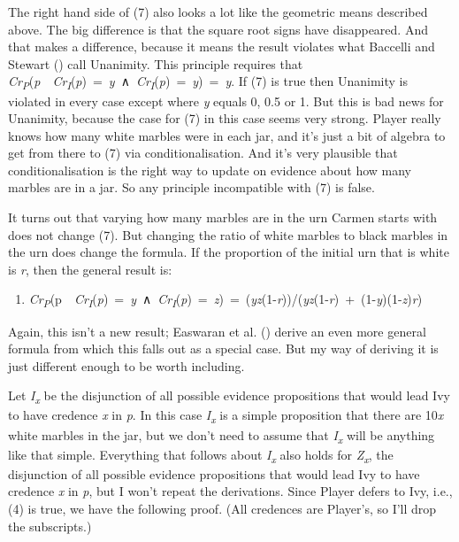 \documentclass[
  11pt,
  letterpaper,
  DIV=11,
  numbers=noendperiod,
  twoside]{scrartcl}
\providecommand{\tightlist}{%
  \setlength{\itemsep}{0pt}\setlength{\parskip}{0pt}}
\begin{document}
The right hand side of (7) also looks a lot like the geometric means
described above. The big difference is that the square root signs have
disappeared. And that makes a difference, because it means the result
violates what Baccelli and Stewart
() call Unanimity. This
principle requires that
\emph{Cr\textsubscript{P}}(\emph{p}~\textbar~\emph{Cr\textsubscript{I}}(\emph{p})~=~\emph{y}~∧~\emph{Cr\textsubscript{I}}(\emph{p})~=~\emph{y})~=~\emph{y}.
If (7) is true then Unanimity is violated in every case except where
\emph{y} equals 0, 0.5 or 1. But this is bad news for Unanimity, because
the case for (7) in this case seems very strong. Player really knows how
many white marbles were in each jar, and it's just a bit of algebra to
get from there to (7) via conditionalisation. And it's very plausible
that conditionalisation is the right way to update on evidence about how
many marbles are in a jar. So any principle incompatible with (7) is
false.

It turns out that varying how many marbles are in the urn Carmen starts
with does not change (7). But changing the ratio of white marbles to
black marbles in the urn does change the formula. If the proportion of
the initial urn that is white is \emph{r}, then the general result is:

\begin{enumerate}
\def\labelenumi{(\arabic{enumi})}
\setcounter{enumi}{7}
\tightlist
\item
  \emph{Cr\textsubscript{P}}(p~\textbar~\emph{Cr\textsubscript{I}}(\emph{p})~=~\emph{y}~∧~\emph{Cr\textsubscript{I}}(\emph{p})~=~\emph{z})~=~(\emph{yz}(1-\emph{r}))/(\emph{yz}(1-\emph{r})~+~(1-\emph{y})(1-\emph{z})\emph{r})
\end{enumerate}

Again, this isn't a new result; Easwaran et al.
() derive an even more general
formula from which this falls out as a special case. But my way of
deriving it is just different enough to be worth including.

Let \emph{I\textsubscript{x}} be the disjunction of all possible
evidence propositions that would lead Ivy to have credence \emph{x} in
\emph{p}. In this case \emph{I\textsubscript{x}} is a simple proposition
that there are 10\emph{x} white marbles in the jar, but we don't need to
assume that \emph{I\textsubscript{x}} will be anything like that simple.
Everything that follows about \emph{I\textsubscript{x}} also holds for
\emph{Z\textsubscript{x}}, the disjunction of all possible evidence
propositions that would lead Ivy to have credence \emph{x} in \emph{p},
but I won't repeat the derivations. Since Player defers to Ivy, i.e.,
(4) is true, we have the following proof. (All credences are Player's,
so I'll drop the subscripts.)
\end{document}
